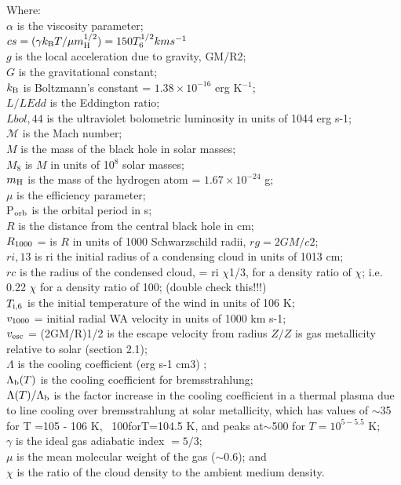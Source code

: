 \documentclass[11pt]{article}
\begin{document}
\noindent
Where:\\
$\alpha$ is the viscosity parameter; \\
$cs = (\gamma k_{\rm B} T/\mu m_{\rm H}^{1/2}) = 150 T_{6}^{1/2} km s^{-1}$ \\
$g$ is the local acceleration due to gravity, GM/R2; \\
$G$ is the gravitational constant; \\
$k_{\rm B}$ is Boltzmann’s constant = $1.38 \times10^{-16}$ erg K$^{-1}$;\\
$L/LEdd$ is the Eddington ratio; \\
$Lbol,44$ is the ultraviolet bolometric luminosity in units of 1044 erg s-1;\\
$\mathcal{M}$  is the Mach number; \\
$M$ is the mass of the black hole in solar masses;\\
$M_{8}$ is $M$ in units of 10$^{8}$ solar masses;\\
$m_{\rm H}$ is the mass of the hydrogen atom = $1.67\times10^{-24}$ g;\\
$\mu$ is the efficiency parameter; \\
P$_{\rm orb}$ is the orbital period in s;\\
$R$ is the distance from the central black hole in cm;\\
$R_{\rm 1000}$ = is $R$ in units of 1000 Schwarzschild radii, $rg = 2GM/c2$; \\
$ri,13$ is ri the initial radius of a condensing cloud in units of 1013 cm;\\
$rc$ is the radius of the condensed cloud, = ri $\chi$1/3, for a density ratio of $\chi$; i.e. 0.22 $\chi$ for a density ratio of 100; (double check this!!!)\\
$T_{\rm i,6}$ is the initial temperature of the wind in units of 106 K; \\
$v_{\rm 1000}$ = initial radial WA velocity in units of 1000 km s-1; \\
$v_{\rm esc}$ = (2GM/R)1/2 is the escape velocity from radius  %
$Z/Z$ is gas metallicity relative to solar (section 2.1); \\
$\Lambda$ is the cooling coefficient (erg s-1 cm3) ; \\
$\Lambda_{\rm b} (T)$ is the cooling coefficient for bremsstrahlung; \\
$\Lambda (T) /\Lambda_{\rm b}$  is the factor increase in the cooling
coefficient in a thermal plasma due to line cooling over
bremsstrahlung at solar metallicity, which has values of $\sim$35 for 
T =105 - 106 K, ~100forT=104.5 K, and peaks at$\sim$500 for $T=10^{5-5.5}$ K;\\
$\gamma$ is the ideal gas adiabatic index $= 5/3$; \\
$\mu$ is the mean molecular weight of the gas ($\sim$0.6); and\\
$\chi$ is the ratio of the cloud density to the ambient medium density.







\end{document}
